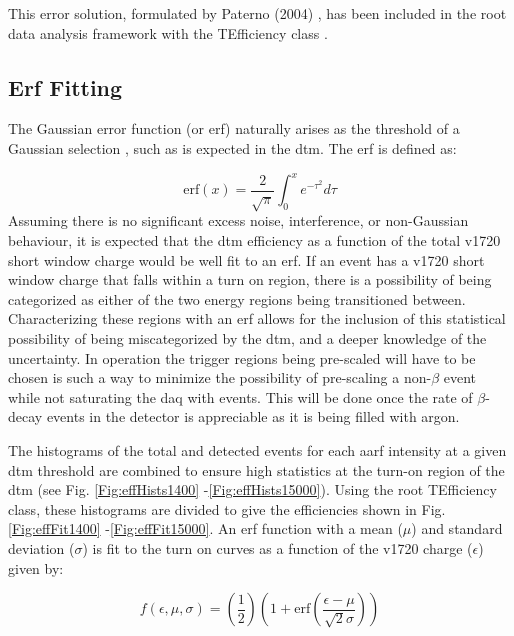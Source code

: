 This error solution, formulated by Paterno (2004) \cite{paterno2004calculatingErrors}, has been included in the \gls{root} data analysis framework with the TEfficiency class \cite{root}.


\subsection{Erf Fitting}
The Gaussian error function (or \gls{erf}) naturally arises as the threshold of a Gaussian selection \cite{Casadei2012SelectionEfficiency}, such as is expected in the \gls{dtm}. The erf is defined as:

\begin{equation}
\text{erf}(x) = \frac{2}{\sqrt{\pi}} \int_{0}^{x} e^{-\tau ^2}d\tau
\label{Eq:erf}
\end{equation}
Assuming there is no significant excess noise, interference, or non-Gaussian behaviour, it is expected that the \gls{dtm} efficiency as a function of the total \gls{v1720} short window charge would be well fit to an \gls{erf}. If an event has a \gls{v1720} short window charge that falls within a turn on region, there is a possibility of being categorized as either of the two energy regions being transitioned between. Characterizing these regions with an \gls{erf} allows for the inclusion of this statistical possibility of being miscategorized by the \gls{dtm}, and a deeper knowledge of the uncertainty. In operation the trigger regions being pre-scaled will have to be chosen is such a way to minimize the possibility of pre-scaling a non-$\beta$ event while not saturating the \gls{daq} with events. This will be done once the rate of $\beta$-decay events in the detector is appreciable as it is being filled with argon.
   
The histograms of the total and detected events for each \gls{aarf} intensity at a given \gls{dtm} threshold are combined to ensure high statistics at the turn-on region of the \gls{dtm} (see Fig. \ref{Fig:effHists1400} -\ref{Fig:effHists15000}). Using the \gls{root} TEfficiency class, these histograms are divided to give the efficiencies shown in Fig. \ref{Fig:effFit1400} -\ref{Fig:effFit15000}. An \gls{erf} function with a mean ($\mu$) and standard deviation ($\sigma$) is fit to the turn on curves as a function of the \gls{v1720} charge ($\epsilon$) given by:


\begin{equation}
f(\epsilon,\mu,\sigma) = \left( \frac{1}{2} \right) \left( 1+\text{erf}\left(\frac{\epsilon-\mu}{\sqrt{2}\sigma}\right)\right)
\label{Eq:fitErf}
\end{equation}


